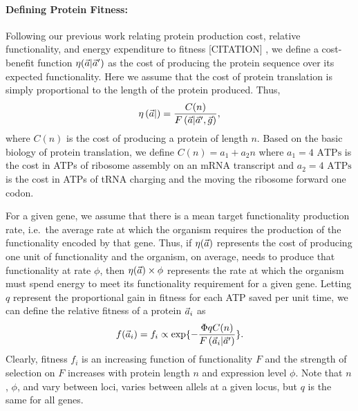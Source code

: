 \paragraph*{Defining Protein Fitness:} 
Following our previous work relating protein production cost, relative functionality, and energy expenditure to fitness [CITATION] \cite{Gilchrist2007,ShahGilchrist2011pnas}, we define a cost-benefit function $\eta(\vec{a}|\vec{a}^\prime)$ as the cost of producing the protein sequence \avec over its expected functionality.
Here we assume that the cost of protein translation is simply proportional to the length of the protein produced.
Thus,
\begin{equation}
\label{eq:etadef}
\eta\left(\vec{a} |\right) = \frac{C(n)}{F\left(\vec{a} | \vec{a}^\prime,\vec{g}\right)},
\end{equation}
where $C(n)$ is the cost of producing a protein of length $n$.
Based on the basic biology of protein translation, we define $C(n) = a_1 + a_2 n $ where  $a_1 = 4\text{ ATPs}$ is the cost in ATPs of ribosome assembly on an mRNA transcript and $a_2 = 4 \text{ ATPs}$ is the cost in ATPs of tRNA charging and the moving the ribosome forward one codon.

For a given gene, we assume that there is a mean target functionality production rate, i.e.~the average rate at which the organism requires the production of the functionality encoded by that gene.
Thus, if $\eta(\vec{a})$ represents the cost of producing one unit of functionality and the organism, on average, needs to produce that functionality at rate $\phi$, then $\eta(\vec{a}) \times \phi$ represents the rate at which the organism must spend energy to meet its functionality requirement for a given gene.
Letting $q$ represent the proportional gain in fitness for each ATP saved per unit time, we can define the relative fitness of a protein $\vec{a}_i$ as
\[
f(\vec{a}_i) = f_i  \propto \exp\{-\frac{\Phi q C(n)}{F\left(\vec{a}_i\middle|\vec{a}^\prime\right)}\}.
\]
Clearly, fitness $f_i$ is an increasing function of functionality $F$ and the strength of selection on $F$ increases with protein length $n$ and expression level $\phi$.
Note that $n$, $\phi$, and \avecopt vary between loci, \avec varies between allels at a given locus, but $q$ is the same for all genes.

